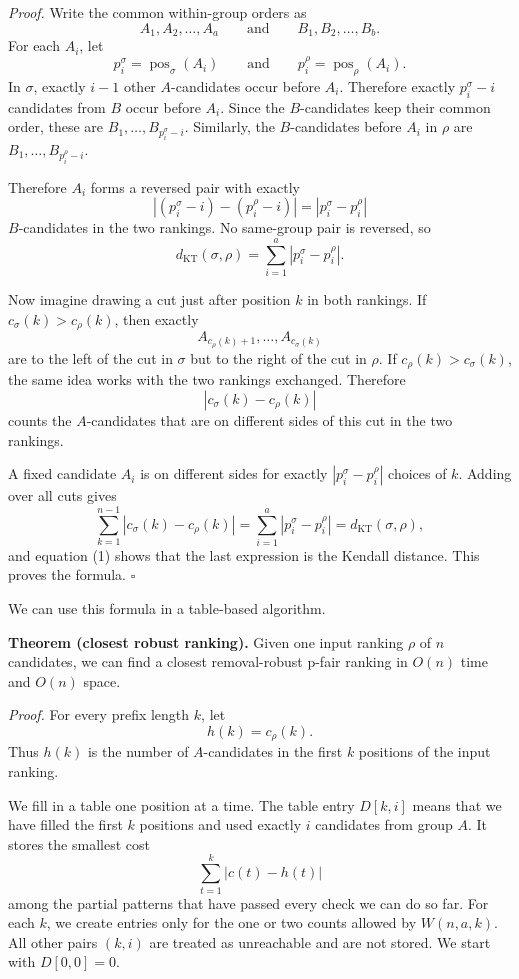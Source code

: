 \documentclass[11pt]{article}
\newcommand{\KT}{d_{\mathrm{KT}}}
\begin{document}
\noindent\textit{Proof.}
Write the common within-group orders as
\[
 A_1,A_2,\ldots,A_a
 \qquad\text{and}\qquad
 B_1,B_2,\ldots,B_b.
\]
For each $A_i$, let
\[
 p_i^\sigma=\operatorname{pos}_\sigma(A_i)
 \qquad\text{and}\qquad
 p_i^\rho=\operatorname{pos}_\rho(A_i).
\]
In $\sigma$, exactly $i-1$ other $A$-candidates occur before $A_i$.
Therefore exactly $p_i^\sigma-i$ candidates from $B$ occur before $A_i$.
Since the $B$-candidates keep their common order, these are
$B_1,\ldots,B_{p_i^\sigma-i}$.  Similarly, the $B$-candidates before $A_i$
in $\rho$ are $B_1,\ldots,B_{p_i^\rho-i}$.

Therefore $A_i$ forms a reversed pair with exactly
\[
 \left|(p_i^\sigma-i)-(p_i^\rho-i)\right|
 =\left|p_i^\sigma-p_i^\rho\right|
\]
$B$-candidates in the two rankings.  No same-group pair is reversed, so
\begin{equation}
 \KT(\sigma,\rho)
 =\sum_{i=1}^{a}\left|p_i^\sigma-p_i^\rho\right|.
 \tag{1}
\end{equation}

Now imagine drawing a cut just after position $k$ in both rankings.  If
$c_\sigma(k)>c_\rho(k)$, then exactly
\[
 A_{c_\rho(k)+1},\ldots,A_{c_\sigma(k)}
\]
are to the left of the cut in $\sigma$ but to the right of the cut in
$\rho$.  If $c_\rho(k)>c_\sigma(k)$, the same idea works with the two rankings
exchanged.  Therefore
\[
 |c_\sigma(k)-c_\rho(k)|
\]
counts the $A$-candidates that are on different sides of this cut in the two
rankings.

A fixed candidate $A_i$ is on different sides for exactly
$|p_i^\sigma-p_i^\rho|$ choices of $k$.  Adding over all cuts gives
\[
 \sum_{k=1}^{n-1}|c_\sigma(k)-c_\rho(k)|
 =\sum_{i=1}^{a}|p_i^\sigma-p_i^\rho|
 =\KT(\sigma,\rho),
\]
and equation (1) shows that the last expression is the Kendall distance.  This
proves the formula. \hfill\(\square\)

We can use this formula in a table-based algorithm.

\medskip
\noindent\textbf{Theorem (closest robust ranking).}
Given one input ranking $\rho$ of $n$ candidates, we can find a closest
removal-robust p-fair ranking in $O(n)$ time and $O(n)$ space.
\medskip

\noindent\textit{Proof.}
For every prefix length $k$, let
\[
 h(k)=c_\rho(k).
\]
Thus $h(k)$ is the number of $A$-candidates in the first $k$ positions of the
input ranking.

We fill in a table one position at a time.  The table entry $D[k,i]$ means
that we have filled the first $k$ positions and used exactly $i$ candidates
from group $A$.  It stores the smallest cost
\[
 \sum_{t=1}^{k}|c(t)-h(t)|
\]
among the partial patterns that have passed every check we can do so far.  For
each $k$, we create entries only for the one or two counts allowed by
$W(n,a,k)$.  All other pairs $(k,i)$ are treated as unreachable and are not
stored.  We start with $D[0,0]=0$.
\end{document}

